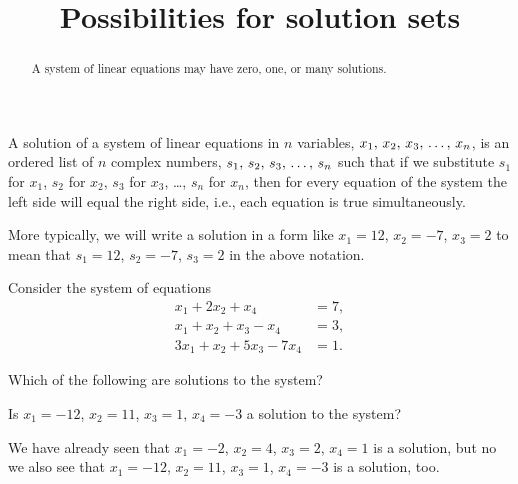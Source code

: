 \documentclass{ximera}
\title{Possibilities for solution sets}
\begin{document}
\begin{abstract}
  A system of linear equations may have zero, one, or many solutions.
\end{abstract}
\maketitle

\begin{definition}
A solution of a system of linear equations in $n$ variables, ${x}_{1},\,{x}_{2},\,{x}_{3},\,\ldots,\,{x}_{n}$, is an ordered list of $n$ complex numbers, ${s}_{1},\,{s}_{2},\,{s}_{3},\,\ldots,\,{s}_{n}$ such that if we substitute $s_1$ for $x_1$, $s_2$ for $x_2$, $s_3$ for $x_3$, \ldots, $s_n$ for $x_n$,  then for every equation of the system the left side will equal the right side, i.e., each equation is true simultaneously.
\end{definition}

More typically, we will write a solution in a form like $x_1=12$, $x_2=-7$, $x_3=2$ to mean that $s_1=12$, $s_2=-7$, $s_3=2$ in the above notation.

\begin{exercise}
  Consider the system of equations
  \begin{align*}
    x_1+2x_2 + x_4&= 7,\\
    x_1+x_2+x_3-x_4&=3,\\
    3x_1+x_2+5x_3-7x_4&=1.
  \end{align*}
  
  \begin{question}
    Which of the following are solutions to the system?
    \begin{multipleChoice}
    \end{multipleChoice}
  \end{question}
  
  \begin{question}
    Is $x_{1}=-12$, $x_{2}=11$, $x_{3}=1$, $x_{4}=-3$ a solution to the system?
    \begin{multipleChoice}
    \end{multipleChoice}
    
    \begin{feedback}
      We have already seen that $x_{1}=-2$, $x_{2}=4$, $x_{3}=2$,
      $x_{4}=1$ is a solution, but no we also see that $x_{1}=-12$,
      $x_{2}=11$, $x_{3}=1$, $x_{4}=-3$ is a solution, too.
    \end{feedback}
  \end{question}
  
\end{exercise}
\end{document}
